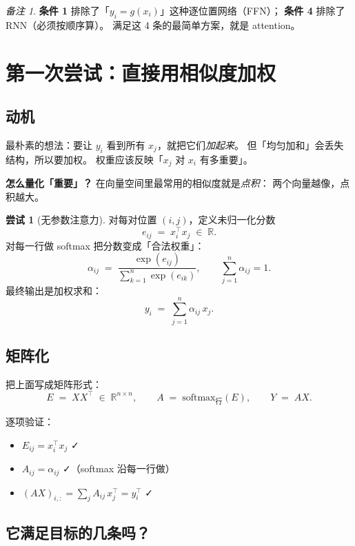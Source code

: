 \documentclass[11pt,a4paper]{ctexart}
\theoremstyle{definition}
\newtheorem{attempt}{尝试}
\theoremstyle{remark}
\newtheorem*{remarkx}{备注}
\newcommand{\R}{\mathbb{R}}
\newcommand{\softmax}{\mathrm{softmax}}
\begin{document}
\begin{remarkx}
\textbf{条件 1} 排除了「$y_i = g(x_i)$」这种逐位置网络（FFN）；
\textbf{条件 4} 排除了 RNN（必须按顺序算）。
满足这 4 条的最简单方案，就是 attention。
\end{remarkx}

\section{第一次尝试：直接用相似度加权}

\subsection{动机}

最朴素的想法：要让 $y_i$ 看到所有 $x_j$，就把它们\emph{加起来}。
但「均匀加和」会丢失结构，所以要加权。
权重应该反映「$x_j$ 对 $x_i$ 有多重要」。

\textbf{怎么量化「重要」？} 在向量空间里最常用的相似度就是\emph{点积}：
两个向量越像，点积越大。

\begin{attempt}[无参数注意力]
对每对位置 $(i, j)$，定义未归一化分数
\[
  e_{ij} \;=\; x_i^\top x_j \;\in\; \R.
\]
对每一行做 softmax 把分数变成「合法权重」：
\[
  \alpha_{ij} \;=\; \frac{\exp(e_{ij})}{\sum_{k=1}^{n} \exp(e_{ik})}, \qquad \sum_{j=1}^{n} \alpha_{ij} = 1.
\]
最终输出是加权求和：
\[
  y_i \;=\; \sum_{j=1}^{n} \alpha_{ij}\, x_j.
\]
\end{attempt}

\subsection{矩阵化}

把上面写成矩阵形式：
\[
  E \;=\; X X^\top \;\in\; \R^{n \times n}, \qquad
  A \;=\; \softmax_{\text{行}}(E), \qquad
  Y \;=\; A X.
\]

逐项验证：
\begin{itemize}
  \item $E_{ij} = x_i^\top x_j$ ✓
  \item $A_{ij} = \alpha_{ij}$ ✓（softmax 沿每一行做）
  \item $(AX)_{i,:} = \sum_j A_{ij}\, x_j^\top = y_i^\top$ ✓
\end{itemize}

\subsection{它满足目标的几条吗？}
\end{document}
